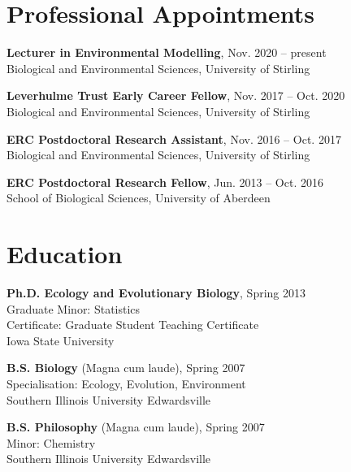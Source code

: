 \documentclass[letterpaper]{article}
\renewenvironment{itemize}{
  \begin{list}{}{
    \setlength{\leftmargin}{1.5em}
  }
}{
  \end{list}
}
\begin{document}
\begin{minipage}{0.65\linewidth}
\section*{Professional Appointments}
\begin{itemize}
	\item{\bf Lecturer in Environmental Modelling}, Nov. 2020 -- present \\
	Biological and Environmental Sciences, University of Stirling
\end{itemize}
\begin{itemize}
	\item{\bf Leverhulme Trust Early Career Fellow}, Nov. 2017 -- Oct. 2020 \\
	Biological and Environmental Sciences, University of Stirling
\end{itemize}
\begin{itemize}
	\item{\bf ERC Postdoctoral Research Assistant}, Nov. 2016 -- Oct. 2017 \\
	Biological and Environmental Sciences, University of Stirling
\end{itemize}
\begin{itemize}
	\item{\bf ERC Postdoctoral Research Fellow}, Jun. 2013 -- Oct. 2016 \\
	School of Biological Sciences, University of Aberdeen
\end{itemize}

\section*{Education}
\begin{itemize}
  \item {\bf Ph.D. Ecology and Evolutionary Biology}, Spring 2013 \\
	Graduate Minor: Statistics \\
	Certificate: Graduate Student Teaching Certificate \\
	Iowa State University
  \item {\bf B.S. Biology} (Magna cum laude), Spring 2007 \\
	Specialisation: Ecology, Evolution, Environment \\
	Southern Illinois University Edwardsville
  \item {\bf B.S. Philosophy} (Magna cum laude), Spring 2007 \\
	Minor: Chemistry \\
	Southern Illinois University Edwardsville
\end{itemize}


\end{minipage}
\end{document}
